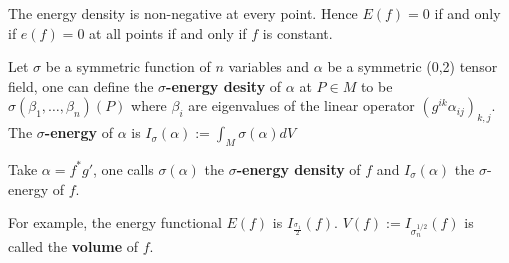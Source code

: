 \begin{remark}
The energy density is non-negative at every point. Hence \(E(f) = 0\) if and only if \(e(f)=0\) at all points if and only if \(f\) is constant.
\end{remark}

\begin{definition}
Let \(\sigma\) be a symmetric function of \(n\) variables and \(\alpha\) be a
symmetric (0,2) tensor field, one can define the \textbf{\(\sigma\)-energy desity} of \(\alpha\) at \(P\in M\) to be \(\sigma
(\beta_1,\dots,\beta_n)(P)\) where \(\beta_i\) are eigenvalues of the linear operator
\((g^{ik}\alpha_{ij})_{k,j}\). The \textbf{\(\sigma\)-energy} of \(\alpha\) is \(I_\sigma(\alpha)
:= \int_M  \sigma(\alpha) dV\)

Take \(\alpha = f^*g'\), one calls \(\sigma(\alpha)\) the \textbf{\(\sigma\)-energy density}
of \(f\) and \(I_\sigma(\alpha)\) the \(\sigma\)-energy of \(f\).
\end{definition}

\begin{exampl}
For example, the energy functional \(E(f)\) is \(I_\frac{\sigma_1}{2}(f)\). \(V(f):=I_{\sigma^{1/2}_n}(f)\) is called the \textbf{volume} of \(f\).
\end{exampl}

